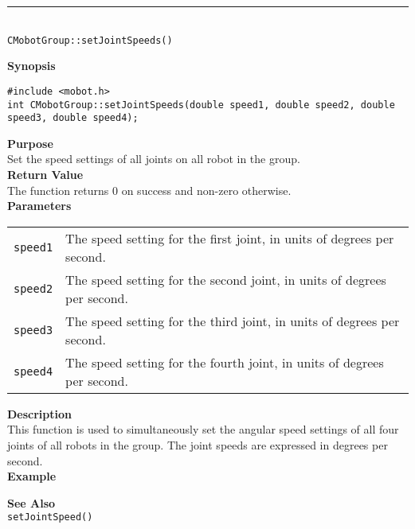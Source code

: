 \noindent
\vspace{5pt}
\rule{4.5in}{0.015in}\\
\noindent
{\LARGE \texttt{CMobotGroup::setJointSpeeds()}}\\
{}

\noindent
{\bf Synopsis}
\vspace{-8pt}
\begin{verbatim}
#include <mobot.h>
int CMobotGroup::setJointSpeeds(double speed1, double speed2, double speed3, double speed4);
\end{verbatim}

\noindent
{\bf Purpose}\\
Set the speed settings of all joints on all robot in the group.\\

\noindent
{\bf Return Value}\\
The function returns 0 on success and non-zero otherwise.\\

\noindent
{\bf Parameters}
\vspace{-0.1in}
\begin{description}
\item               
\begin{tabular}{p{10 mm}p{145 mm}}
\texttt{speed1} & The speed setting for the first joint, in units of degrees per second. \\
\texttt{speed2} & The speed setting for the second joint, in units of degrees per second. \\
\texttt{speed3} & The speed setting for the third joint, in units of degrees per second. \\
\texttt{speed4} & The speed setting for the fourth joint, in units of degrees per second. \\
\end{tabular}
\end{description}

\noindent
{\bf Description}\\
This function is used to simultaneously set the angular speed settings of
all four joints of all robots in the group. The joint speeds are expressed in
degrees per second. \\

\noindent
{\bf Example}\\
\noindent

\noindent
{\bf See Also}\\
\texttt{setJointSpeed()}

